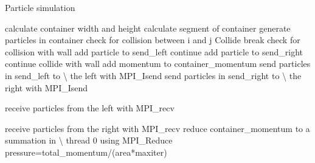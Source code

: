 \documentclass[10pt,twocolumn]{article}
\begin{document}
\begin{algorithm}[H]
\caption{Particle simulation}
\label{alg:Master}
\begin{algorithmic}
\State calculate container width and height
\State calculate segment of container
\State generate particles in container
\State check for collision between i and j
\State Collide
\State break
\EndIf
\EndFor
{}
\State check for collision with wall
\State add particle to send\_left
\State continue
\EndIf
{}
\State add particle to send\_right
\State continue
\EndIf
{}
\State collide with wall
\State add momentum to container\_momentum
\EndIf 
\EndIf
\EndFor
\State send particles in send\_left to \textbackslash
\State the left with MPI\_Isend
\State send particles in send\_right to \textbackslash
\State the right with MPI\_Isend

\State receive particles from the left with MPI\_recv

\State receive particles from the right with MPI\_recv
\EndFor
\State reduce container\_momentum to a summation in \textbackslash
\State thread 0 using MPI\_Reduce
\State pressure=total\_momentum/(area*maxiter)
\EndIf
\EndProcedure
\end{algorithmic}
\end{algorithm}
\end{document}

